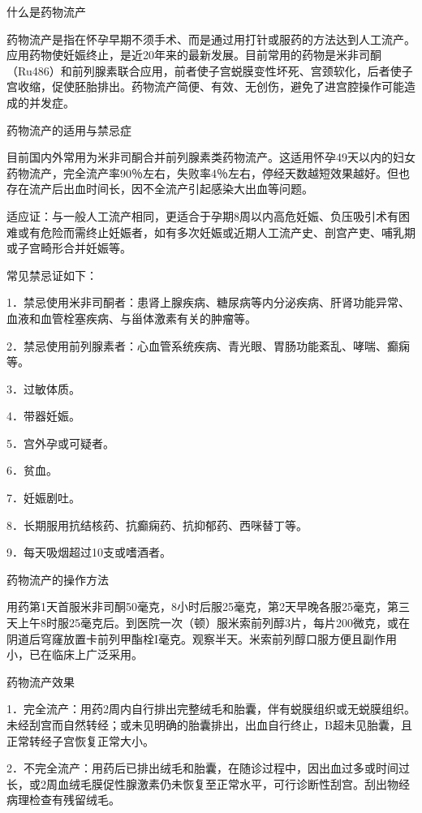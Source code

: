 \documentclass[12pt,UTF8]{ctexbook}
\begin{document}
什么是药物流产


药物流产是指在怀孕早期不须手术、而是通过用打针或服药的方法达到人工流产。应用药物使妊娠终止，是近20年来的最新发展。目前常用的药物是米非司酮（Ru486）和前列腺素联合应用，前者使子宫蜕膜变性坏死、宫颈软化，后者使子宫收缩，促使胚胎排出。药物流产简便、有效、无创伤，避免了进宫腔操作可能造成的并发症。





药物流产的适用与禁忌症


目前国内外常用为米非司酮合并前列腺素类药物流产。这适用怀孕49天以内的妇女药物流产，完全流产率90％左右，失败率4％左右，停经天数越短效果越好。但也存在流产后出血时间长，因不全流产引起感染大出血等问题。

适应证：与一般人工流产相同，更适合于孕期8周以内高危妊娠、负压吸引术有困难或有危险而需终止妊娠者，如有多次妊娠或近期人工流产史、剖宫产吏、哺乳期或子宫畸形合并妊娠等。

常见禁忌证如下：

1．禁忌使用米非司酮者：患肾上腺疾病、糖尿病等内分泌疾病、肝肾功能异常、血液和血管栓塞疾病、与甾体激素有关的肿瘤等。

2．禁忌使用前列腺素者：心血管系统疾病、青光眼、胃肠功能紊乱、哮喘、癫痫等。

3．过敏体质。

4．带器妊娠。

5．宫外孕或可疑者。

6．贫血。

7．妊娠剧吐。

8．长期服用抗结核药、抗癫痫药、抗抑郁药、西咪替丁等。

9．每天吸烟超过10支或嗜酒者。





药物流产的操作方法


用药第1天首服米非司酮50毫克，8小时后服25毫克，第2天早晚各服25毫克，第三天上午8时服25毫克后。到医院一次（顿）服米索前列醇3片，每片200微克，或在阴道后穹窿放置卡前列甲酯栓I毫克。观察半天。米索前列醇口服方便且副作用小，已在临床上广泛采用。





药物流产效果


1．完全流产：用药2周内自行排出完整绒毛和胎囊，伴有蜕膜组织或无蜕膜组织。未经刮宫而自然转经；或未见明确的胎囊排出，出血自行终止，B超未见胎囊，且正常转经子宫恢复正常大小。

2．不完全流产：用药后已排出绒毛和胎囊，在随诊过程中，因出血过多或时间过长，或2周血绒毛膜促性腺激素仍未恢复至正常水平，可行诊断性刮宫。刮出物经病理检查有残留绒毛。
\end{document}
